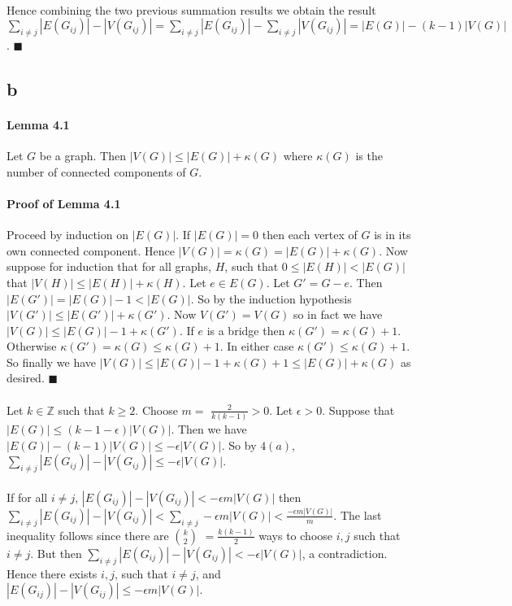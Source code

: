 \documentclass[letterpaper,12pt,oneside,onecolumn]{report}
\begin{document}
\paragraph{}
Hence combining the two previous summation results we obtain the result $\sum_{i\neq j}|E(G_{ij})| - |V(G_{ij})| = \sum_{i\neq j} |E(G_{ij})| - \sum_{i\neq j} |V(G_{ij})| = |E(G)| - (k-1)|V(G)|$. $\blacksquare$
\subsection*{b}
\paragraph{Lemma 4.1}
Let $G$ be a graph. Then $|V(G)| \leq |E(G)| + \kappa(G)$ where $\kappa(G)$ is the number of connected components of $G$.
\paragraph{Proof of Lemma 4.1}
Proceed by induction on $|E(G)|$. If $|E(G)| = 0$ then each vertex of $G$ is in its own connected component. Hence $|V(G)| = \kappa(G) = |E(G)| + \kappa(G)$. Now suppose for induction that for all graphs, $H$, such that $0 \leq |E(H)| < |E(G)|$ that $|V(H)| \leq |E(H)| + \kappa(H)$. Let $e \in E(G)$. Let $G' = G - e$. Then $|E(G')| = |E(G)| - 1 < |E(G)|$. So by the induction hypothesis $|V(G')| \leq |E(G')| + \kappa(G')$. Now $V(G') = V(G)$ so in fact we have $|V(G)| \leq |E(G)| - 1 + \kappa(G')$. If $e$ is a bridge then $\kappa(G') = \kappa(G) + 1$. Otherwise $\kappa(G') = \kappa(G) \leq \kappa(G) + 1$. In either case $\kappa(G') \leq \kappa(G) + 1$. So finally we have $|V(G)| \leq |E(G)| -1 + \kappa(G) + 1 \leq |E(G)| + \kappa(G)$ as desired. $\blacksquare$ 
\paragraph{}
Let $k \in \mathbb{Z}$ such that $k \geq 2$. Choose $m =$ $\frac{2}{k(k-1)} > 0$. Let $\epsilon > 0$. Suppose that $|E(G)| \leq (k - 1 - \epsilon) |V(G)|$. Then we have $|E(G)| - (k-1)|V(G)| \leq -\epsilon |V(G)|$. So by $4(a)$, $\sum_{i \neq j} |E(G_{ij})| - |V(G_{ij})| \leq -\epsilon |V(G)|$. 
\paragraph{}
If for all $i \neq j$, $|E(G_{ij})| - |V(G_{ij})| < - \epsilon m |V(G)|$ then $\sum_{i \neq j} |E(G_{ij})| - |V(G_{ij})| < \sum_{i \neq j } -  \epsilon m |V(G)| < \frac{-\epsilon m |V(G)|}{m}$. The last inequality follows since there are $k \choose 2$ $= \frac{k(k-1)}{2}$ ways to choose $i,j$ such that $i \neq j$. But then $\sum_{i \neq j} |E(G_{ij})| - |V(G_{ij})| < -\epsilon |V(G)|$, a contradiction. Hence there exists $i, j$, such that $i \neq j$, and $|E(G_{ij})| - |V(G_{ij})| \leq - \epsilon m |V(G)|$.
\end{document}
